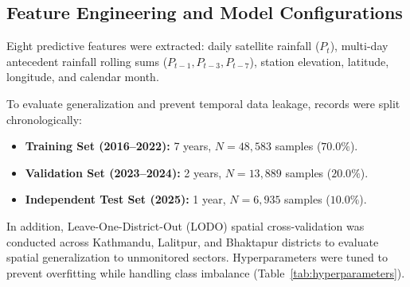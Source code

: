 \documentclass[conference]{IEEEtran}
\begin{document}
\begin{table}[!t]
\centering
\caption{Daily Rainfall Intensity Classification Thresholds and Sample Distribution Across the Chronological Split (19 Stations, 2016--2025)}
\label{tab:intensity_classes}
\end{table}

\subsection{Feature Engineering and Model Configurations}
Eight predictive features were extracted: daily satellite rainfall ($P_t$), multi-day antecedent rainfall rolling sums ($P_{t-1}, P_{t-3}, P_{t-7}$), station elevation, latitude, longitude, and calendar month.

To evaluate generalization and prevent temporal data leakage, records were split chronologically:
\begin{itemize}
    \item \textbf{Training Set (2016--2022):} 7 years, $N = 48{,}583$ samples ($70.0\%$).
    \item \textbf{Validation Set (2023--2024):} 2 years, $N = 13{,}889$ samples ($20.0\%$).
    \item \textbf{Independent Test Set (2025):} 1 year, $N = 6{,}935$ samples ($10.0\%$).
\end{itemize}
In addition, Leave-One-District-Out (LODO) spatial cross-validation was conducted across Kathmandu, Lalitpur, and Bhaktapur districts to evaluate spatial generalization to unmonitored sectors. Hyperparameters were tuned to prevent overfitting while handling class imbalance (Table~\ref{tab:hyperparameters}).
\end{document}
